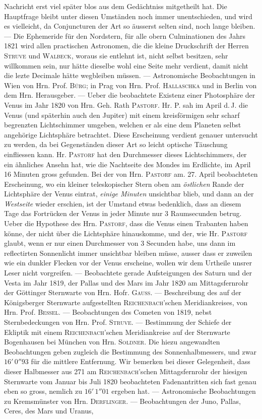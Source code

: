 Nachricht erst viel später blos aus dem Gedächtniss mitgetheilt hat. Die Hauptfrage bleibt unter diesen Umständen noch immer unentschieden, und wird es vielleicht, da Conjuncturen der Art so äusserst selten sind, noch lange bleiben. --- Die Ephemeride für den Nordstern, für alle obern Culminationen des Jahrs 1821 wird allen practischen Astronomen, die die kleine Druckschrift der Herren \textsc{Struve} und \textsc{Walbeck}, woraus sie entlehnt ist, nicht selbst besitzen, sehr willkommen sein, nur hätte dieselbe wohl eine Seite mehr verdient, damit nicht die lezte Decimale hätte wegbleiben müssen. --- Astronomische Beobachtungen in Wien von Hrn. Prof. \textsc{Bürg}; in Prag von Hrn. Prof. \textsc{Hallaschka} und in Berlin von dem Hrn. Herausgeber. --- Ueber die beobachtete Existenz einer Photosphäre der Venus im Jahr 1820 von Hrn. Geh. Rath \textsc{Pastorf}. Hr. P. sah im April d.\,J. die Venus (und späterhin auch den Jupiter) mit einem kreisförmigen sehr scharf begrenzten Lichtschimmer umgeben, welchen er als eine dem Planeten selbst angehörige Lichtsphäre betrachtet. Diese Erscheinung verdient genauer untersucht zu werden, da bei Gegenständen dieser Art so leicht optische Täuschung einfliessen kann. Hr. \textsc{Pastorf} hat den Durchmesser dieses Lichtschimmers, der ein ähnliches Ansehn hat, wie die Nachtseite des Mondes im Erdlichte, im April 16 Minuten gross gefunden. Bei der von Hrn. \textsc{Pastorf} am. 27. April beobachteten Erscheinung, wo ein kleiner teleskopischer Stern oben am \emph{östlichen} Rande der Lichtsphäre der Venus eintrat, \emph{einige Minuten} unsichtbar blieb, und dann an der \emph{Westseite} wieder erschien, ist der Umstand etwas bedenklich, dass an diesem Tage das Fortrücken der Venus in jeder Minute nur 3 Raumsecunden betrug. Ueber die Hypothese des Hrn. \textsc{Pastorf}, dass die Venus einen Trabanten haben könne, der nicht über die Lichtsphäre hinauskomme, und der, wie Hr. \textsc{Pastorf} glaubt, wenn er nur einen Durchmesser von 3 Secunden habe, uns dann im reflectirten Sonnenlicht immer unsichtbar bleiben müsse, ausser dass er zuweilen wie ein dunkler Flecken vor der Venus erscheine, wollen wir dem Urtheile unsrer Leser nicht vorgreifen. --- Beobachtete gerade Aufsteigungen des Saturn und der Vesta im Jahr 1819, der Pallas und des Mars im Jahr 1820 am Mittagsfernrohr der Göttinger Sternwarte von Hrn. Hofr. \textsc{Gauss}. --- Beschreibung des auf der Königsberger Sternwarte aufgestellten \textsc{Reichenbach}'schen Meridiankreises, von Hrn. Prof. \textsc{Bessel}. --- Beobachtungen des Cometen von 1819, nebst Sternbedeckungen von Hrn. Prof. \textsc{Struve}. --- Bestimmung der Schiefe der Ekliptik mit einem \textsc{Reichenbach}'schen Meridiankreise auf der Sternwarte Bogenhausen bei München von Hrn. \textsc{Soldner}. Die hiezu angewandten Beobachtungen geben zugleich die Bestimmung des Sonnenhalbmessers, und zwar $16'\,0''93$ für die mittlere Entfernung. Wir bemerken bei dieser Gelegenheit, dass dieser Halbmesser aus 271 am \textsc{Reichenbach}'schen Mittagsfernrohr der hiesigen Sternwarte vom Januar bis Juli 1820 beobachteten Fadenantritten sich fast genau eben so gross, nemlich zu $16'\,1''01$ ergeben hat. --- Astronomische Beobachtungen zu Kremsmünster von Hrn. \textsc{Derflinger}. --- Beobachtungen der Juno, Pallas, Ceres, des Mars und Uranus, 